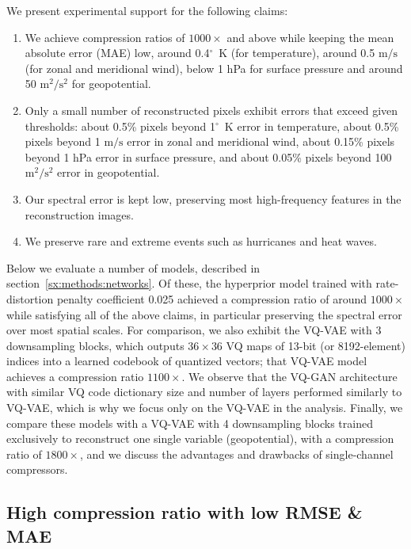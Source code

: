 We present experimental support for the following claims:
\begin{enumerate}
    \item We achieve compression ratios of $1000\times$ and above while keeping the mean absolute error (MAE) low, around 0.4$^\circ$~K (for temperature), around 0.5 $\text{m}/\text{s}$ (for zonal and meridional wind), below 1 hPa for surface pressure and around 50 $\text{m}^2/\text{s}^2$ for geopotential.
    \label{claim:cr_and_mae}
    \item Only a small number of reconstructed pixels exhibit errors that exceed given thresholds: about 0.5\% pixels beyond 1$^\circ$~K error in temperature, about 0.5\% pixels beyond 1 $\text{m}/\text{s}$ error in zonal and meridional wind, about 0.15\% pixels beyond 1 hPa error in surface pressure, and about 0.05\% pixels beyond 100 $\text{m}^2/\text{s}^2$ error in geopotential. \label{claim:few_bad_pixels}
    \item Our spectral error is kept low, preserving most high-frequency features in the reconstruction images.
    \item We preserve rare and extreme events such as hurricanes and heat waves.
\end{enumerate}
%
Below we evaluate a number of models, described in section~\ref{sx:methods:networks}. Of these, the hyperprior model trained with rate-distortion penalty coefficient 0.025 achieved a compression ratio of around $1000 \times$ while satisfying all of the above claims, in particular preserving the spectral error over most spatial scales. For comparison, we also exhibit the VQ-VAE with 3 downsampling blocks, which outputs $36 \times 36$ VQ maps of 13-bit (or 8192-element) indices into a learned codebook of quantized vectors; that VQ-VAE model achieves a compression ratio $1100 \times$. We observe that the VQ-GAN architecture with similar VQ code dictionary size and number of layers performed similarly to VQ-VAE, which is why we focus only on the VQ-VAE in the analysis.
Finally, we compare these models with a VQ-VAE with 4 downsampling blocks trained exclusively to reconstruct one single variable (geopotential), with a compression ratio of $1800 \times$, and we discuss the advantages and drawbacks of single-channel compressors.


\subsection{High compression ratio with low RMSE \& MAE}

